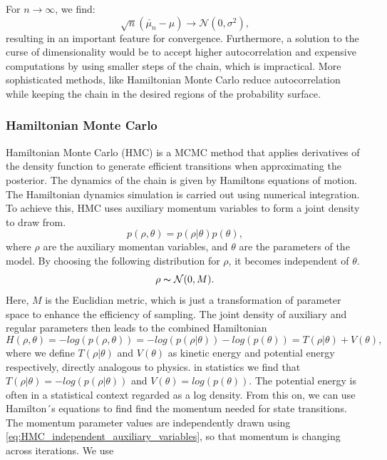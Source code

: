 For $n \to \infty$, we find:
\begin{equation}%
	\label{eq:markov chain convergence}
	\sqrt{n}(\hat{\mu_n}-\mu) \to \mathcal{N}(0, \sigma^2),         
\end{equation}
resulting in an important feature for convergence. Furthermore, a solution to the curse of dimensionality would be to accept higher autocorrelation and expensive computations by using smaller steps of the chain, which is impractical. More sophisticated methods, like Hamiltonian Monte Carlo reduce autocorrelation while keeping the chain in the desired regions of the probability surface. 

\subsubsection{Hamiltonian Monte Carlo}
Hamiltonian Monte Carlo (HMC) \cite{Duane_1987} is a MCMC method that applies derivatives of the density function to generate efficient transitions when approximating the posterior. The dynamics of the chain is given by Hamiltons equations of motion. The Hamiltonian dynamics simulation is carried out using numerical integration. To achieve this, HMC uses auxiliary momentum variables to form a joint density to draw from. 
\begin{equation}%
	p(\rho, \theta) = p(\rho | \theta) p(\theta),
\label{eq: HMC joint density for regular and auxiliar variables}
\end{equation}
where $\rho$ are the auxiliary momentan variables, and $\theta$ are the parameters of the model. By choosing the following distribution for $\rho$, it becomes independent of $\theta$.
\begin{equation}%
	\rho \thicksim \mathcal{N}(0,M).
\label{eq:HMC_independent_auxiliary_variables}
\end{equation}
Here, $M$ is the Euclidian metric, which is just a transformation of parameter space to enhance the efficiency of sampling. The joint density of auxiliary and regular parameters then leads to the combined Hamiltonian
\begin{equation}%
	H(\rho,\theta) = -log(p(\rho, \theta)) = -log(p(\rho | \theta)) - log(p(\theta)) = T(\rho | \theta) + V(\theta),
\label{eq: HMC Hamiltonian}
\end{equation}
where we define $T(\rho | \theta)$ and $V(\theta)$ as kinetic energy and potential energy respectively, directly analogous to physics. in statistics we find that $T(\rho | \theta) = -log(p(\rho | \theta))$ and $V(\theta) = log(p(\theta))$. The potential energy is often in a statistical context regarded as a log density. From this on, we can use Hamilton´s equations to find find the momentum needed for state transitions. The momentum parameter values are independently drawn using \ref{eq:HMC_independent_auxiliary_variables}, so that momentum is changing across iterations. We use
